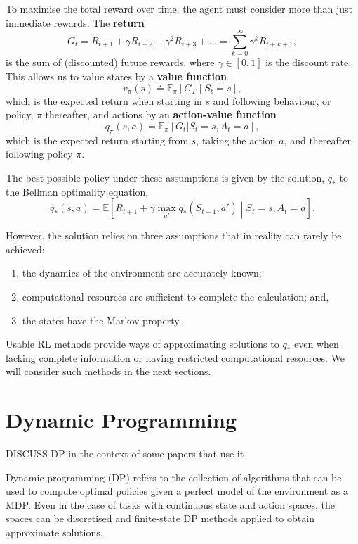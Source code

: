 \documentclass{article}
\begin{document}
To maximise the total reward over time, the agent must consider more than just immediate rewards. The \textbf{return} $$G_t = R_{t+1} + \gamma R_{t+2} + \gamma^2 R_{t+3} + \dots = \sum_{k=0}^{\infty} \gamma^k R_{t+k+1},$$ is the sum of (discounted) future rewards, where $\gamma \in [0,1]$ is the discount rate. This allows us to value states by a \textbf{value function} $$v_\pi(s) \doteq \mathbb{E}_\pi \left[ G_T \middle| S_t = s \right],$$ which is the expected return when starting in $s$ and following behaviour, or policy, $\pi$ thereafter, and actions by an \textbf{action-value function} $$q_\pi(s, a) \doteq \mathbb{E}_\pi[G_t | S_t = s, A_t = a],$$ which is the expected return starting from $s$, taking the action $a$, and thereafter following policy $\pi$.

The best possible policy under these assumptions is given by the solution, $q_*$ to the Bellman optimality equation, $$ q_*(s,a) = \mathbb{E} \left[ R_{t+1} + \gamma \max_{a'} q_*(S_{t+1},a') \middle| S_t=s, A_t=a \right].$$ 

However, the solution relies on three assumptions that in reality can rarely be achieved:

\begin{enumerate}
\def\labelenumi{\arabic{enumi}.}
\item
  the dynamics of the environment are accurately known;
\item
  computational resources are sufficient to complete the calculation; and,
\item
  the states have the Markov property.
\end{enumerate}

Usable RL methods provide ways of approximating solutions to $q_*$ even when lacking complete information or having restricted computational resources. We will consider such methods in the next sections.

\section{Dynamic Programming}

DISCUSS DP in the context of some papers that use it 

Dynamic programming (DP) refers to the collection of algorithms
that can be used to compute optimal policies given a perfect model of
the environment as a MDP. Even in the case of tasks with continuous state and action spaces, the spaces can be discretised and finite-state DP methods applied to obtain approximate solutions.
\end{document}
